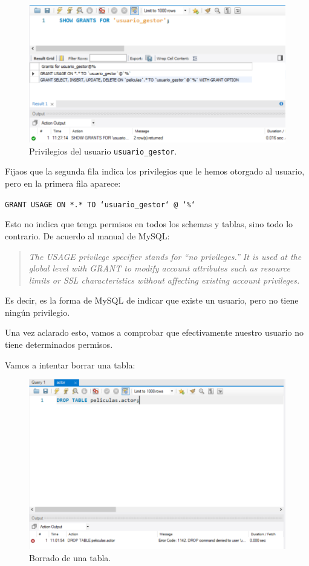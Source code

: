 \documentclass{db-practice}
\begin{document}
\begin{figure}[H]
    \centering
    \includegraphics[width=\textwidth]{figs/gestion-usuarios/grants_usuario.PNG}
    \caption{Privilegios del usuario \texttt{usuario\_gestor}.}
    \label{fig:grants-usuario}
\end{figure}

Fijaos que la segunda fila indica los privilegios que le hemos otorgado al usuario, pero en la primera fila aparece:

\texttt{GRANT USAGE ON *.* TO `usuario\_gestor` @ `\%`}


Esto no indica que tenga permisos en todos los schemas y tablas, sino todo lo contrario. De acuerdo al manual de MySQL:

\begin{quote}
    \textit{The USAGE privilege specifier stands for ``no privileges.'' It is used at the global level with GRANT to modify account attributes such as resource limits or SSL characteristics without affecting existing account privileges.}
\end{quote}

Es decir, es la forma de MySQL de indicar que existe un usuario, pero no tiene ningún privilegio. 

Una vez aclarado esto, vamos a comprobar que efectivamente nuestro usuario no tiene determinados permisos.

Vamos a intentar borrar una tabla:

\begin{figure}[H]
    \centering
    \includegraphics[width=\textwidth]{figs/gestion-usuarios/drop_usr.PNG}
    \caption{Borrado de una tabla.}
    \label{fig:borrar}
\end{figure}
\end{document}
